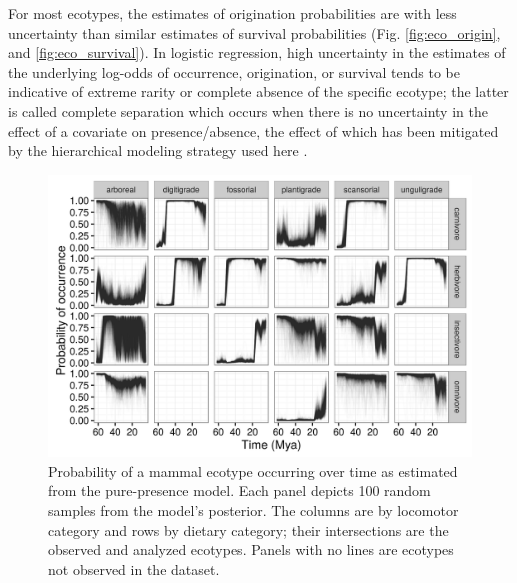 \documentclass[12pt,letterpaper]{article}
\begin{document}
For most ecotypes, the estimates of origination probabilities are with less uncertainty than similar estimates of survival probabilities (Fig. \ref{fig:eco_origin}, and \ref{fig:eco_survival}). In logistic regression, high uncertainty in the estimates of the underlying log-odds of occurrence, origination, or survival tends to be indicative of extreme rarity or complete absence of the specific ecotype; the latter is called complete separation which occurs when there is no uncertainty in the effect of a covariate on presence/absence, the effect of which has been mitigated by the hierarchical modeling strategy used here \citep{Gelman2013d,Gelman2007,McElreath2016}.


\begin{figure}[ht]
  \centering
  \includegraphics[width=\textwidth,height=0.4\textheight,keepaspectratio=true]{figure/ecotype_occurrence}
  \caption[Ecotype occurrence probability estimated from the pure-presence model]{Probability of a mammal ecotype occurring over time as estimated from the pure-presence model. Each panel depicts 100 random samples from the model's posterior. The columns are by locomotor category and rows by dietary category; their intersections are the observed and analyzed ecotypes. Panels with no lines are ecotypes not observed in the dataset.}
  \label{fig:eco_occur}
\end{figure}
\end{document}
